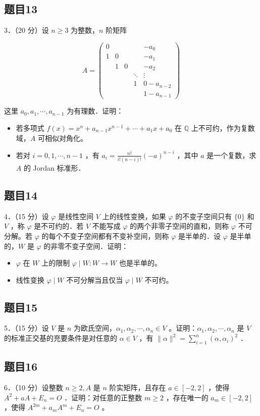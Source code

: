 \documentclass{article}
\begin{document}
\subsection{题目13}
3．（20 分）设 \(n \geq 3\) 为整数，\(n\) 阶矩阵

\[
A=\left(\begin{array}{ccccc}
0 & & & & -a_{0} \\
1 & 0 & & & -a_{1} \\
& 1 & 0 & & -a_{2} \\
& & & \ddots & \vdots \\
& & & 1 & 0-a_{n-2} \\
& & & & 1-a_{n-1}
\end{array}\right)
\]

这里 \(a_{0}, a_{1}, \cdots, a_{n-1}\) 为有理数．证明：

\begin{itemize}
  \item[（1）] 若多项式 \(f(x)=x^{n}+a_{n-1} x^{n-1}+\cdots+a_{1} x+a_{0}\) 在 \(\mathbb{Q}\) 上不可约，作为复数域，\(A\) 可相似对角化。
  \item[（2）] 若对 \(i=0,1, \cdots, n-1\) ，有 \(a_{i}=\frac{n!}{i!(n-i)!}(-a)^{n-i}\) ，其中 \(a\) 是一个复数，求 \(A\) 的 Jordan 标准形．
\end{itemize}

\subsection{题目14}
4．（15 分）设 \(\varphi\) 是线性空间 \(V\) 上的线性变换，如果 \(\varphi\) 的不变子空间只有 \(\{0\}\) 和 \(V\) ，称 \(\varphi\) 是不可约的．若 \(V\) 不能写成 \(\varphi\) 的两个非零子空间的直和，则称 \(\varphi\) 不可分解。若 \(\varphi\) 的每个不变子空间都有不变补空间，则称 \(\varphi\) 是半单的．设 \(\varphi\) 是半单的，\(W\) 是 \(\varphi\) 的非零不变子空间．证明：

\begin{itemize}
  \item[（1）] \(\varphi\) 在 \(W\) 上的限制 \(\varphi \mid W: W \rightarrow W\) 也是半单的。
  \item[（2）] 线性变换 \(\varphi \mid W\) 不可分解当且仅当 \(\varphi \mid W\) 不可约。
\end{itemize}

\subsection{题目15}
5．（15 分）设 \(V\) 是 \(n\) 为欧氏空间，\(\alpha_{1}, \alpha_{2}, \cdots, \alpha_{n} \in V\) 。证明：\(\alpha_{1}, \alpha_{2}, \cdots, \alpha_{n}\) 是 \(V\) 的标准正交基的充要条件是对任意的 \(\alpha \in V\) ，有 \(\|\alpha\|^{2}=\sum_{i=1}^{n}\left(\alpha, \alpha_{i}\right)^{2}\) ．

\subsection{题目16}
6．（10 分）设整数 \(n \geq 2, A\) 是 \(n\) 阶实矩阵，且存在 \(a \in[-2,2]\) ，使得 \(A^{2}+a A+E_{n}=O\) ．证明：对任意的正整数 \(m \geq 2\) ，存在唯一的 \(a_{m} \in[-2,2]\) ，使得 \(A^{2 m}+a_{m} A^{m}+E_{n}=O\) 。
\end{document}

